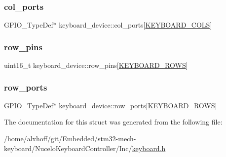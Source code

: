 \mbox{\label{structkeyboard__device_ac896175bb4e598e4e62671f2525d93b5}} 
\subsubsection{\texorpdfstring{col\+\_\+ports}{col\_ports}}
{\footnotesize\ttfamily G\+P\+I\+O\+\_\+\+Type\+Def$\ast$ keyboard\+\_\+device\+::col\+\_\+ports\mbox{[}\hyperlink{keymap_8h_ada65ea6a2010790e481acf033b2f8351}{K\+E\+Y\+B\+O\+A\+R\+D\+\_\+\+C\+O\+LS}\mbox{]}}

\mbox{\label{structkeyboard__device_afb61cd72f0bdd515150a10e46e9ecfc3}} 
\subsubsection{\texorpdfstring{row\+\_\+pins}{row\_pins}}
{\footnotesize\ttfamily uint16\+\_\+t keyboard\+\_\+device\+::row\+\_\+pins\mbox{[}\hyperlink{keymap_8h_ab89c69b09d4ca01020b7c40d9ca2bab8}{K\+E\+Y\+B\+O\+A\+R\+D\+\_\+\+R\+O\+WS}\mbox{]}}

\mbox{\label{structkeyboard__device_a3538201c09ca68013a086626a63ca362}} 
\subsubsection{\texorpdfstring{row\+\_\+ports}{row\_ports}}
{\footnotesize\ttfamily G\+P\+I\+O\+\_\+\+Type\+Def$\ast$ keyboard\+\_\+device\+::row\+\_\+ports\mbox{[}\hyperlink{keymap_8h_ab89c69b09d4ca01020b7c40d9ca2bab8}{K\+E\+Y\+B\+O\+A\+R\+D\+\_\+\+R\+O\+WS}\mbox{]}}



The documentation for this struct was generated from the following file\+:\begin{DoxyCompactItemize}
\item 
/home/alxhoff/git/\+Embedded/stm32-\/mech-\/keyboard/\+Nucelo\+Keyboard\+Controller/\+Inc/\hyperlink{keyboard_8h}{keyboard.\+h}\end{DoxyCompactItemize}
